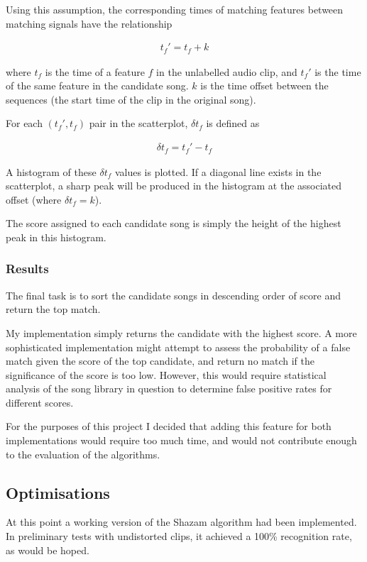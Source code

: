 \documentclass[12pt,a4paper,twoside,openright]{report}
\begin{document}
Using this assumption, the corresponding times of matching features between matching signals have the relationship

\begin{align*}
  t_f' = t_f + k 
\end{align*}

where $t_f$ is the time of a feature $f$ in the unlabelled audio clip, and $t_f'$ is the time of the same feature in the candidate song. $k$ is the time offset between the sequences (the start time of the clip in the original song).

For each $(t_f',t_f)$ pair in the scatterplot, $\delta t_f$ is defined as

\begin{align*}
  \delta t_f = t_f' - t_f
\end{align*}

A histogram of these $\delta t_f$ values is plotted. If a diagonal line exists in the scatterplot, a sharp peak will be produced in the histogram at the associated offset (where $\delta t_f = k$).

The score assigned to each candidate song is simply the height of the highest peak in this histogram.


\subsubsection{Results}

The final task is to sort the candidate songs in descending order of score and return the top match. 

My implementation simply returns the candidate with the highest score. A more sophisticated implementation might attempt to assess the probability of a false match given the score of the top candidate, and return no match if the significance of the score is too low. However, this would require statistical analysis of the song library in question to determine false positive rates for different scores.

For the purposes of this project I decided that adding this feature for both implementations would require too much time, and would not contribute enough to the evaluation of the algorithms.


\subsection{Optimisations}
\label{section:shazamoptimisations}

At this point a working version of the Shazam algorithm had been implemented. In preliminary tests with undistorted clips, it achieved a 100\% recognition rate, as would be hoped.
\end{document}
